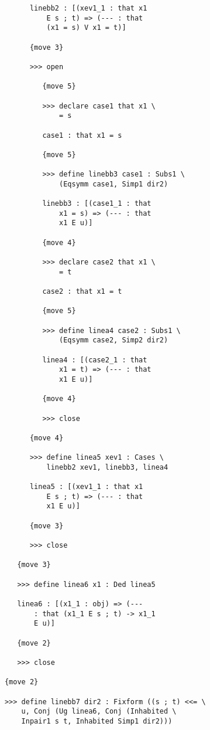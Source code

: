 \documentclass[12pt]{article}
\begin{document}
\begin{verbatim}
            linebb2 : [(xev1_1 : that x1 
                E s ; t) => (--- : that 
                (x1 = s) V x1 = t)]

            {move 3}

            >>> open

               {move 5}

               >>> declare case1 that x1 \
                   = s

               case1 : that x1 = s

               {move 5}

               >>> define linebb3 case1 : Subs1 \
                   (Eqsymm case1, Simp1 dir2)

               linebb3 : [(case1_1 : that 
                   x1 = s) => (--- : that 
                   x1 E u)]

               {move 4}

               >>> declare case2 that x1 \
                   = t

               case2 : that x1 = t

               {move 5}

               >>> define linea4 case2 : Subs1 \
                   (Eqsymm case2, Simp2 dir2)

               linea4 : [(case2_1 : that 
                   x1 = t) => (--- : that 
                   x1 E u)]

               {move 4}

               >>> close

            {move 4}

            >>> define linea5 xev1 : Cases \
                linebb2 xev1, linebb3, linea4

            linea5 : [(xev1_1 : that x1 
                E s ; t) => (--- : that 
                x1 E u)]

            {move 3}

            >>> close

         {move 3}

         >>> define linea6 x1 : Ded linea5

         linea6 : [(x1_1 : obj) => (--- 
             : that (x1_1 E s ; t) -> x1_1 
             E u)]

         {move 2}

         >>> close

      {move 2}

      >>> define linebb7 dir2 : Fixform ((s ; t) <<= \
          u, Conj (Ug linea6, Conj (Inhabited \
          Inpair1 s t, Inhabited Simp1 dir2)))


\end{verbatim}
\end{document}
